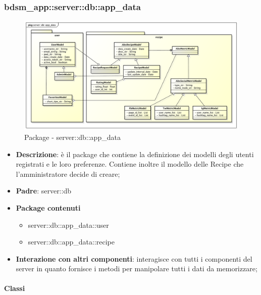 \subsubsection{bdsm\_app::server::db::app\_data} %
\label{ssub:bdsm_app_server_app_data}


	\begin{figure}[htbp]
		\centering
		\centerline{\includegraphics[scale=0.38]{./images/server/app_data.pdf}}
		\caption{Package - server::db::app\_data}
	\end{figure}


	\begin{itemize}
		\item \textbf{Descrizione}: è il package che contiene la definizione dei modelli degli utenti registrati e le loro preferenze. Contiene inoltre il modello delle Recipe che l'amministratore decide di creare;
		\item \textbf{Padre}: server::db
		\item \textbf{Package contenuti}
			\begin{itemize}
				\item server::db::app\_data::user
				\item server::db::app\_data::recipe
			\end{itemize}
		\item \textbf{Interazione con altri componenti}: interagisce con tutti i componenti del server in quanto fornisce i metodi per manipolare tutti i dati da memorizzare;
	\end{itemize}


	\paragraph{Classi} %

